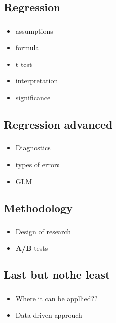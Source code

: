 \documentclass[t, 11pt]{beamer}
\begin{document}
	\subsection{Regression}
	\begin{frame}\label{}
		\frametitle{\insertsection}
		\frametitle{\insertsubsection}
		
		\begin{itemize}
			\item assumptions 
			\item formula 
			\item t-test
			\item interpretation
			\item significance
		\end{itemize}	  
	\end{frame}			
	
	\subsection{Regression advanced}
	\begin{frame}\label{}
		\frametitle{\insertsection}
		\frametitle{\insertsubsection}
		
		\begin{itemize}
			\item Diagnostics 
			\item types of errors 
			\item GLM
		\end{itemize}	  
	\end{frame}			
	
	\subsection{Methodology}
	\begin{frame}\label{}
		\frametitle{\insertsection}
		\frametitle{\insertsubsection}
		
		\begin{itemize}
			\item Design  of research 
			\item \textbf{A\slash B} tests
		\end{itemize}	  
		
	\end{frame}			
	
		\subsection{Last but nothe least}
	\begin{frame}\label{}
		\frametitle{\insertsection}
		\frametitle{\insertsubsection}
		
		\begin{itemize}
			\item Where it can be appllied??
			\item Data-driven approuch 
		\end{itemize}	  
		
	\end{frame}		
	
\end{document}
